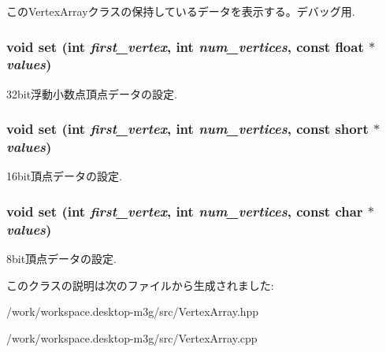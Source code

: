 このVertexArrayクラスの保持しているデータを表示する。デバッグ用. \hypertarget{classm3g_1_1VertexArray_24b9d666468f856b2bf09e450b20fdfb}{
\subsubsection[{set}]{\setlength{\rightskip}{0pt plus 5cm}void set (int {\em first\_\-vertex}, \/  int {\em num\_\-vertices}, \/  const float $\ast$ {\em values})}}
\label{classm3g_1_1VertexArray_24b9d666468f856b2bf09e450b20fdfb}


32bit浮動小数点頂点データの設定. \hypertarget{classm3g_1_1VertexArray_f417744f1798d293c85c5e7fb6e1e846}{
\subsubsection[{set}]{\setlength{\rightskip}{0pt plus 5cm}void set (int {\em first\_\-vertex}, \/  int {\em num\_\-vertices}, \/  const short $\ast$ {\em values})}}
\label{classm3g_1_1VertexArray_f417744f1798d293c85c5e7fb6e1e846}


16bit頂点データの設定. \hypertarget{classm3g_1_1VertexArray_c92a86c7439c8e38c7e5b69e3eca3ee1}{
\subsubsection[{set}]{\setlength{\rightskip}{0pt plus 5cm}void set (int {\em first\_\-vertex}, \/  int {\em num\_\-vertices}, \/  const char $\ast$ {\em values})}}
\label{classm3g_1_1VertexArray_c92a86c7439c8e38c7e5b69e3eca3ee1}


8bit頂点データの設定. 

このクラスの説明は次のファイルから生成されました:\begin{CompactItemize}
\item 
/work/workspace.desktop-m3g/src/VertexArray.hpp\item 
/work/workspace.desktop-m3g/src/VertexArray.cpp\end{CompactItemize}
